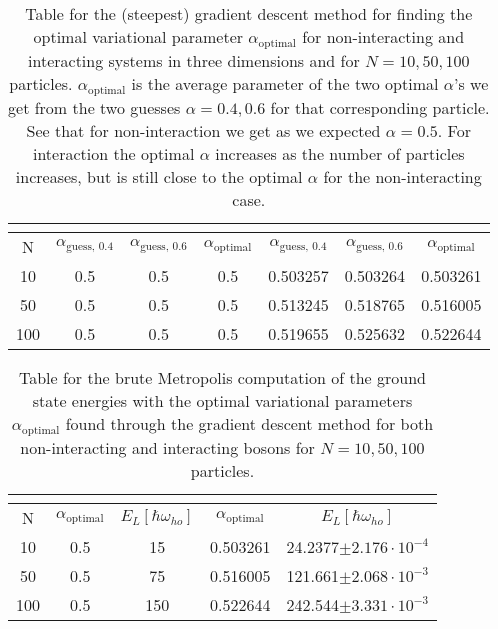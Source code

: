 \documentclass[12pt,a4paper,english]{article}
\begin{document}
\begin{table}[htbp!]
	\centering
	\begin{tabular}{ |c|c|c|c|c|c|c| }
		\hline \rule{0pt}{13pt}
		\text{System} & \multicolumn{3}{c|}{\text{Non-interacting}}  & \multicolumn{3}{c|}{\text{Interacting}}\\
		\hline \rule{0pt}{13pt}
		N & $\alpha_{\text{guess, 0.4}}$ & $\alpha_{\text{guess, 0.6}}$ & $\alpha_{\text{optimal}}$ & $\alpha_{\text{guess, 0.4}}$ & $\alpha_{\text{guess, 0.6}}$ & $\alpha_{\text{optimal}}$  \\
		\hline \rule{0pt}{13pt}
		10 & 0.5 & 0.5 & 0.5 & 0.503257 & 0.503264 & 0.503261 \\
		\hline \rule{0pt}{13pt}
		50 & 0.5 & 0.5 & 0.5 & 0.513245 & 0.518765 & 0.516005 \\
		\hline \rule{0pt}{13pt}
		100 & 0.5 & 0.5 & 0.5 & 0.519655 & 0.525632 & 0.522644 \\
		\hline
	\end{tabular}	
	\caption{Table for the (steepest) gradient descent method for finding the optimal variational parameter $\alpha_{\text{optimal}}$ for non-interacting and interacting systems in three dimensions and for $N=10,50,100$ particles. $\alpha_{\text{optimal}}$ is the average parameter of the two optimal $\alpha$'s we get from the two guesses $\alpha=0.4,0.6$ for that corresponding particle. See that for non-interaction we get as we expected $\alpha=0.5$. For interaction the optimal $\alpha$ increases as the number of particles increases, but is still close to the optimal $\alpha$ for the non-interacting case. \label{tab:gradient}}
\end{table}

\begin{table}[htbp!]
	\centering
	\begin{tabular}{ |c|c|c|c|c| }
		\hline \rule{0pt}{13pt}
		\text{System} & \multicolumn{2}{c|}{\text{Non-interacting}}  & \multicolumn{2}{c|}{\text{Interacting}} \\
		\hline \rule{0pt}{13pt}
		N &  $\alpha_{\text{optimal}}$ & $E_L[\hbar\omega_{ho}]$ & $\alpha_{\text{optimal}}$ & $E_L[\hbar\omega_{ho}]$ \\
		\hline \rule{0pt}{13pt}
		10 & 0.5 & 15 & 0.503261 & 24.2377$\pm2.176\cdot10^{-4}$ \\
		\hline \rule{0pt}{13pt}
		50 & 0.5 & 75 & 0.516005 & 121.661$\pm2.068\cdot10^{-3}$ \\
		\hline \rule{0pt}{13pt}
		100 & 0.5 & 150 & 0.522644 & 242.544$\pm3.331\cdot10^{-3}$ \\
		\hline
	\end{tabular}	
	\caption{Table for the brute Metropolis computation of the ground state energies with the optimal variational parameters $\alpha_{\text{optimal}}$ found through the gradient descent method for both non-interacting and interacting bosons for $N=10,50,100$ particles. \label{tab:optimal_alpha_grad}}
\end{table}
\end{document}
